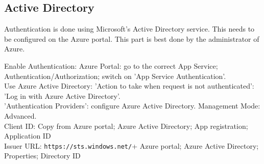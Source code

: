 \subsection{Active Directory}

Authentication is done using Microsoft's Active Directory service. This needs to be configured on the Azure portal. This part is best done by the administrator of Azure.

Enable Authentication: Azure Portal: go to the correct App Service; Authentication/Authorization; switch on 'App Service Authentication'.\\ 
Use Azure Active Directory: 'Action to take when request is not authenticated': 'Log in with Azure Active Directory'.\\
'Authentication Providers': configure Azure Active Directory. Management Mode:
Advanced. \\

Client ID: Copy from Azure portal; Azure Active Directory; App registration; Application ID\\
Issuer URL: \verb|https://sts.windows.net/|+ Azure portal; Azure Active Directory;  Properties; Directory ID\\
 